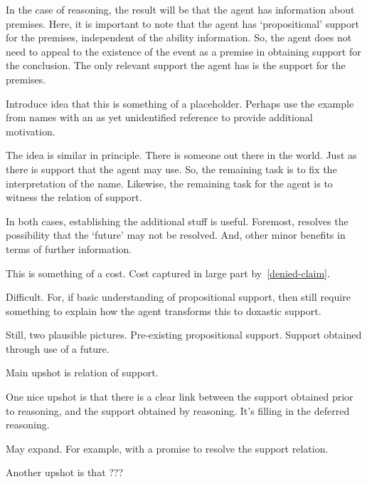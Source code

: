 \begin{note}
  In the case of reasoning, the result will be that the agent has information about premises.
  Here, it is important to note that the agent has `propositional' support for the premises, independent of the ability information.
  So, the agent does not need to appeal to the existence of the event as a premise in obtaining support for the conclusion.
  The only relevant support the agent has is the support for the premises.
\end{note}

\begin{note}
  Introduce idea that this is something of a placeholder.
  Perhaps use the example from names with an as yet unidentified reference to provide additional motivation.

  The idea is similar in principle.
  There is someone out there in the world.
  Just as there is support that the agent may use.
  So, the remaining task is to fix the interpretation of the name.
  Likewise, the remaining task for the agent is to witness the relation of support.

  In both cases, establishing the additional stuff is useful.
  Foremost, resolves the possibility that the `future' may not be resolved.
  And, other minor benefits in terms of further information.
\end{note}

\begin{note}
  This is something of a cost.
  Cost captured in large part by~\ref{denied-claim}.

  Difficult.
  For, if basic understanding of propositional support, then still require something to explain how the agent transforms this to doxastic support.
  

  Still, two plausible pictures.
  Pre-existing propositional support.
  Support obtained through use of a future.
\end{note}

\begin{note}[Upshot]
  Main upshot is relation of support.

  One nice upshot is that there is a clear link between the support obtained prior to reasoning, and the support obtained by reasoning.
  It's filling in the deferred reasoning.

  May expand.
  For example, with a promise to resolve the support relation.

  Another upshot is that ???
\end{note}


